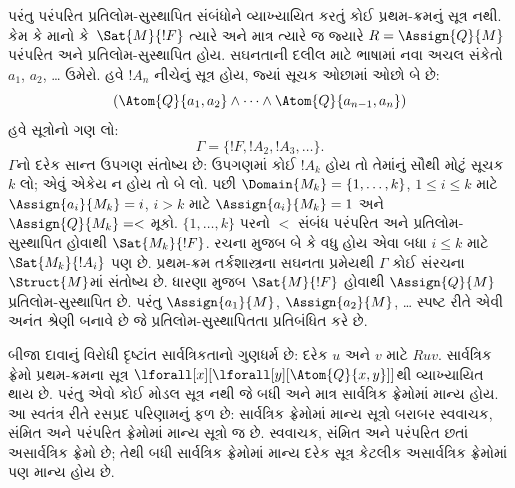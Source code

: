 પરંતુ પરંપરિત પ્રતિલોમ-સુસ્થાપિત સંબંધોને
વ્યાખ્યાયિત કરતું કોઈ પ્રથમ-ક્રમનું સૂત્ર
નથી. કેમ કે માનો કે~$\Sat{M}{!F}$ ત્યારે અને માત્ર
ત્યારે જ જ્યારે $R =
\Assign{Q}{M}$ પરંપરિત અને પ્રતિલોમ-સુસ્થાપિત હોય.
સઘનતાની દલીલ માટે ભાષામાં નવા અચલ સંકેતો
$a_1$, $a_2$, \dots{} ઉમેરો. હવે $!A_n$ નીચેનું
સૂત્ર હોય, જ્યાં સૂચક ઓછામાં ઓછો બે છે:
\[
(\Atom{Q}{a_1,a_2} \land \dots \land
    \Atom{Q}{a_{n-1},a_{n}})
\]
હવે સૂત્રોનો ગણ લો:
\[
\Gamma = \{!F, !A_2, !A_3, \dots\}.
\]
$\Gamma$નો દરેક સાન્ત ઉપગણ સંતોષ્ય છે: ઉપગણમાં
કોઈ $!A_k$ હોય તો તેમાંનું સૌથી મોટું સૂચક $k$
લો; એવું એકેય ન હોય તો બે લો. પછી
$\Domain{M_k} = \{1, \dots, k\}$,
$1\le i\le k$ માટે $\Assign{a_i}{M_k} = i$,
$i>k$ માટે $\Assign{a_i}{M_k}=1$ અને
$\Assign{Q}{M_k} = <$ મૂકો.
$\{1,
\dots, k\}$ પરનો $<$ સંબંધ પરંપરિત અને
પ્રતિલોમ-સુસ્થાપિત હોવાથી $\Sat{M_k}{!F}$.
રચના મુજબ બે કે વધુ હોય એવા બધા $i \le k$ માટે
$\Sat{M_k}{!A_i}$ પણ છે.
પ્રથમ-ક્રમ તર્કશાસ્ત્રના સઘનતા પ્રમેયથી $\Gamma$
કોઈ સંરચના~$\Struct{M}$માં સંતોષ્ય છે.
ધારણા મુજબ $\Sat{M}{!F}$ હોવાથી
$\Assign{Q}{M}$ પ્રતિલોમ-સુસ્થાપિત છે. પરંતુ
$\Assign{a_1}{M}$, $\Assign{a_2}{M}$,
\dots{} સ્પષ્ટ રીતે એવી અનંત શ્રેણી બનાવે છે
જે પ્રતિલોમ-સુસ્થાપિતતા પ્રતિબંધિત કરે છે.

બીજા દાવાનું વિરોધી દૃષ્ટાંત સાર્વત્રિકતાનો ગુણધર્મ
છે: દરેક $u$ અને $v$ માટે $Ruv$. સાર્વત્રિક
ફ્રેમો પ્રથમ-ક્રમના સૂત્ર
$\lforall[x][\lforall[y][\Atom{Q}{x,y}]]$થી
વ્યાખ્યાયિત થાય છે. પરંતુ એવો કોઈ મોડલ સૂત્ર
નથી જે બધી અને માત્ર સાર્વત્રિક ફ્રેમોમાં માન્ય હોય.
આ સ્વતંત્ર રીતે રસપ્રદ પરિણામનું ફળ છે: સાર્વત્રિક
ફ્રેમોમાં માન્ય સૂત્રો બરાબર સ્વવાચક, સંમિત અને
પરંપરિત ફ્રેમોમાં માન્ય સૂત્રો જ છે. સ્વવાચક,
સંમિત અને પરંપરિત છતાં અસાર્વત્રિક ફ્રેમો છે;
તેથી બધી સાર્વત્રિક ફ્રેમોમાં માન્ય દરેક સૂત્ર
કેટલીક અસાર્વત્રિક ફ્રેમોમાં પણ માન્ય હોય છે.
\endgroup

\begingroup
\makeatletter{}\makeatother


